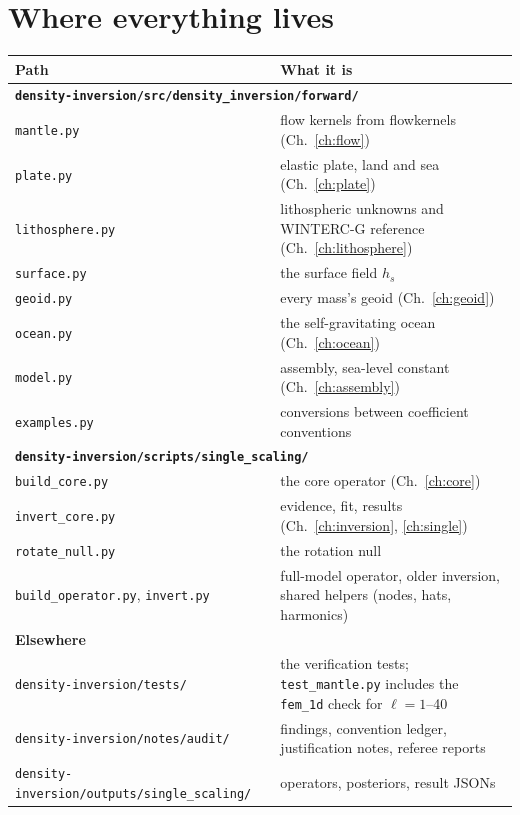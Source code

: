 \chapter{Where everything lives}
\label{app:files}

\begin{center}
\small
\begin{longtable}{p{}p{}}
\toprule
Path & What it is\\
\midrule
\endhead
\multicolumn{2}{l}{\textbf{\texttt{density-inversion/src/density\_inversion/forward/}}}\\
\texttt{mantle.py} & flow kernels from flowkernels (Ch.~\ref{ch:flow})\\
\texttt{plate.py} & elastic plate, land and sea (Ch.~\ref{ch:plate})\\
\texttt{lithosphere.py} & lithospheric unknowns and WINTERC-G reference (Ch.~\ref{ch:lithosphere})\\
\texttt{surface.py} & the surface field $h_s$\\
\texttt{geoid.py} & every mass's geoid (Ch.~\ref{ch:geoid})\\
\texttt{ocean.py} & the self-gravitating ocean (Ch.~\ref{ch:ocean})\\
\texttt{model.py} & assembly, sea-level constant (Ch.~\ref{ch:assembly})\\
\texttt{examples.py} & conversions between coefficient conventions\\
\multicolumn{2}{l}{\textbf{\texttt{density-inversion/scripts/single\_scaling/}}}\\
\texttt{build\_core.py} & the core operator (Ch.~\ref{ch:core})\\
\texttt{invert\_core.py} & evidence, fit, results (Ch.~\ref{ch:inversion}, \ref{ch:single})\\
\texttt{rotate\_null.py} & the rotation null\\
\texttt{build\_operator.py}, \texttt{invert.py} & full-model operator, older inversion, shared helpers (nodes, hats, harmonics)\\
\multicolumn{2}{l}{\textbf{Elsewhere}}\\
\texttt{density-inversion/tests/} & the verification tests; \texttt{test\_mantle.py} includes the \texttt{fem\_1d} check for $\ell=1$--40\\
\texttt{density-inversion/notes/audit/} & findings, convention ledger, justification notes, referee reports\\
\texttt{density-inversion/outputs/single\_scaling/} & operators, posteriors, result JSONs\\

\end{longtable}
\end{center}
